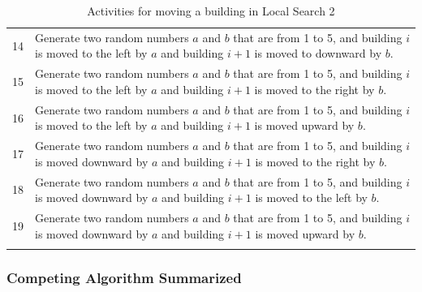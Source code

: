 \begin{longtable}{| c | p{120mm} |}
	14 & Generate two random numbers $a$ and $b$ that are from 1 to 5, and building $i$ is moved to the left by $a$ and building $i + 1$ is moved to downward by $b$. \\
	15 & Generate two random numbers $a$ and $b$ that are from 1 to 5, and building $i$ is moved to the left by $a$ and building $i + 1$ is moved to the right by $b$. \\
	16 & Generate two random numbers $a$ and $b$ that are from 1 to 5, and building $i$ is moved to the left by $a$ and building $i + 1$ is moved upward by $b$. \\
	17 & Generate two random numbers $a$ and $b$ that are from 1 to 5, and building $i$ is moved downward by $a$ and building $i + 1$ is moved to the right by $b$. \\
	18 & Generate two random numbers $a$ and $b$ that are from 1 to 5, and building $i$ is moved downward by $a$ and building $i + 1$ is moved to the left by $b$. \\
	19 & Generate two random numbers $a$ and $b$ that are from 1 to 5, and building $i$ is moved downward by $a$ and building $i + 1$ is moved upward by $b$. \\
	\hline
	\caption{Activities for moving a building in Local Search 2}
	\label{local-search-2-activities}
\end{longtable}

\subsubsection{Competing Algorithm Summarized}
